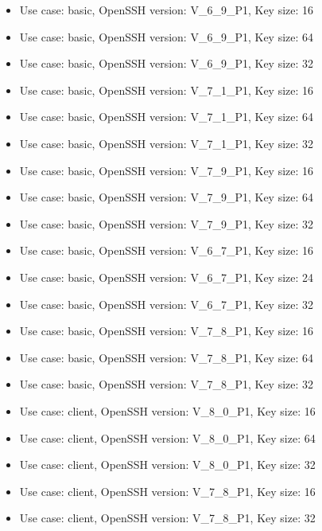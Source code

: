\begin{itemize}
            \item Use case: basic, OpenSSH version: V\_6\_9\_P1, Key size: 16
            \item Use case: basic, OpenSSH version: V\_6\_9\_P1, Key size: 64
            \item Use case: basic, OpenSSH version: V\_6\_9\_P1, Key size: 32
            \item Use case: basic, OpenSSH version: V\_7\_1\_P1, Key size: 16
            \item Use case: basic, OpenSSH version: V\_7\_1\_P1, Key size: 64
            \item Use case: basic, OpenSSH version: V\_7\_1\_P1, Key size: 32
            \item Use case: basic, OpenSSH version: V\_7\_9\_P1, Key size: 16
            \item Use case: basic, OpenSSH version: V\_7\_9\_P1, Key size: 64
            \item Use case: basic, OpenSSH version: V\_7\_9\_P1, Key size: 32
            \item Use case: basic, OpenSSH version: V\_6\_7\_P1, Key size: 16
            \item Use case: basic, OpenSSH version: V\_6\_7\_P1, Key size: 24
            \item Use case: basic, OpenSSH version: V\_6\_7\_P1, Key size: 32
            \item Use case: basic, OpenSSH version: V\_7\_8\_P1, Key size: 16
            \item Use case: basic, OpenSSH version: V\_7\_8\_P1, Key size: 64
            \item Use case: basic, OpenSSH version: V\_7\_8\_P1, Key size: 32
            \item Use case: client, OpenSSH version: V\_8\_0\_P1, Key size: 16
            \item Use case: client, OpenSSH version: V\_8\_0\_P1, Key size: 64
            \item Use case: client, OpenSSH version: V\_8\_0\_P1, Key size: 32
            \item Use case: client, OpenSSH version: V\_7\_8\_P1, Key size: 16
            \item Use case: client, OpenSSH version: V\_7\_8\_P1, Key size: 32
        \end{itemize}